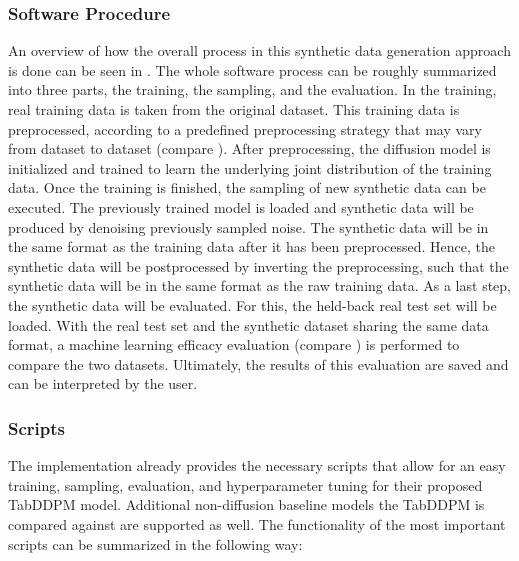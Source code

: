 \subsubsection[]{Software Procedure}
\label{ch:Software_Procedure}

An overview of how the overall process in this synthetic data generation approach is done can be seen in .
The whole software process can be roughly summarized into three parts, the training, the sampling, and the evaluation.
In the training, real training data is taken from the original dataset.
This training data is preprocessed, according to a predefined preprocessing strategy that may vary from dataset to dataset (compare ).
After preprocessing, the diffusion \gls{model} is initialized and trained to learn the underlying joint distribution of the training data.
Once the training is finished, the sampling of new synthetic data can be executed.
The previously trained \gls{model} is loaded and synthetic data will be produced by denoising previously sampled noise.
The synthetic data will be in the same format as the training data after it has been preprocessed.
Hence, the synthetic data will be postprocessed by inverting the preprocessing, such that the synthetic data will be in the same format as the raw training data.
As a last step, the synthetic data will be evaluated. 
For this, the held-back real test set will be loaded.
With the real test set and the synthetic dataset sharing the same data format, a machine learning efficacy evaluation (compare ) is performed to compare the two datasets.
Ultimately, the results of this evaluation are saved and can be interpreted by the user.

\subsubsection[]{Scripts}
\label{ch:scripts}

The implementation \cite{akim2023TabDDPMModellingTabular} already provides the necessary scripts that allow for an
easy training, sampling, evaluation, and hyperparameter tuning for their proposed TabDDPM \gls{model}.
Additional non-diffusion baseline \glspl{model} the TabDDPM is compared against are supported as well.
The functionality of the most important scripts can be summarized in the following way:

